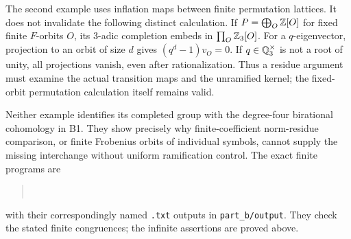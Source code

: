 The second example uses inflation maps between finite permutation
lattices.  It does not invalidate the following distinct calculation.
If \(P=\bigoplus_O\mathbb Z[O]\) for fixed finite \(F\)-orbits \(O\),
its \(3\)-adic completion embeds in \(\prod_O\mathbb Z_3[O]\).
For a \(q\)-eigenvector, projection to an orbit of size \(d\) gives
\((q^d-1)v_O=0\).  If \(q\in\mathbb Q_3^\times\) is not a root of unity,
all projections vanish, even after rationalization.  Thus a residue
argument must examine the actual transition maps and the unramified
kernel; the fixed-orbit permutation calculation itself remains valid.

Neither example identifies its completed group with the degree-four
birational cohomology in B1.  They show precisely why finite-coefficient
norm-residue comparison, or finite Frobenius orbits of individual
symbols, cannot supply the missing interchange without uniform
ramification control.  The exact finite programs are
\begin{quote}
\small
{}\\
\end{quote}
with their correspondingly named \texttt{.txt} outputs in
\texttt{part\_b/output}.  They check the stated finite congruences;
the infinite assertions are proved above.
